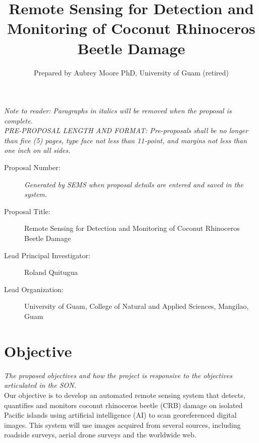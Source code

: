 \documentclass[11pt,english,letterpaper]{scrartcl}
\begin{document}
\titlehead{DRAFT SERDP FY25 PREPROPOSAL}
\title{Remote Sensing for Detection and Monitoring of Coconut Rhinoceros Beetle Damage}
\author{Prepared by Aubrey Moore PhD, University of Guam (retired)}

\maketitle

\tableofcontents{}\clearpage{}

\textit{Note to reader: Paragraphs in italics will be removed when the proposal is complete.} \\

\textit{PRE-PROPOSAL LENGTH AND FORMAT: 
Pre-proposals shall be no longer than five (5) pages, type face not less than 11-point, and margins
not less than one inch on all sides.} 

\begin{description}
	
\item[Proposal Number:] \emph{Generated by SEMS when proposal details are entered and saved in the system.}

\item[Proposal Title:] Remote Sensing for Detection and Monitoring of Coconut Rhinoceros Beetle Damage

\item[Lead Principal Investigator:] Roland Quitugua

\item[Lead Organization:] University of Guam, College of Natural and Applied Sciences, Mangilao, Guam

\end{description}


\section{Objective}

\textit{The proposed objectives and how the project is responsive to the objectives
	articulated in the SON.}\\
	
Our objective is to develop an automated remote sensing system that detects, quantifies and monitors coconut rhinoceros beetle (CRB) damage on isolated Pacific islands using artificial intelligence (AI) to scan georeferenced digital images. This system will use images acquired from several sources, including roadside surveys, aerial drone surveys and the worldwide web.
\end{document}
